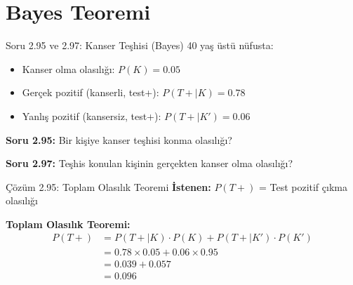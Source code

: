 \documentclass[light]{lutbeamer}
\begin{document}
\section{Bayes Teoremi}

\begin{frame}{Soru 2.95 ve 2.97: Kanser Teşhisi (Bayes)}
    40 yaş üstü nüfusta:
    \begin{itemize}
        \item Kanser olma olasılığı: $P(K) = 0.05$
        \item Gerçek pozitif (kanserli, test+): $P(T+|K) = 0.78$
        \item Yanlış pozitif (kansersiz, test+): $P(T+|K') = 0.06$
    \end{itemize}
    
    \textbf{Soru 2.95:} Bir kişiye kanser teşhisi konma olasılığı?
    
    \textbf{Soru 2.97:} Teşhis konulan kişinin gerçekten kanser olma olasılığı?
\end{frame}

\begin{frame}{Çözüm 2.95: Toplam Olasılık Teoremi}
    \color{blue}
    \textbf{İstenen:} $P(T+)$ = Test pozitif çıkma olasılığı
    
    \vspace{0.3cm}
    \textbf{Toplam Olasılık Teoremi:}
    \begin{align*}
    P(T+) &= P(T+|K) \cdot P(K) + P(T+|K') \cdot P(K') \\
          &= 0.78 \times 0.05 + 0.06 \times 0.95 \\
          &= 0.039 + 0.057 \\
          &= 0.096
    \end{align*}
    
    \begin{center}
    \end{center}
\end{frame}
\end{document}
